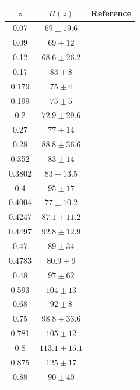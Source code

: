 \documentclass[twocolumn]{aastex631}
\begin{document}
   \begin{table}
      \centering
      \begin{tabular}{ccl}
         \hline\hline
         $z$ & $H(z)$ & Reference \\
         \hline     
         0.07 & $69 \pm 19.6$ & \cite{Zhang_2014} \\
         0.09 & $69 \pm 12$ & \cite{PhysRevD.71.123001} \\
         0.12 & $68.6 \pm 26.2$ & \cite{Zhang_2014} \\
         0.17 & $83 \pm 8$ & \cite{PhysRevD.71.123001} \\
         0.179 & $75 \pm 4$ & \cite{M.Moresco_2012} \\
         0.199 & $75 \pm 5$ & \cite{M.Moresco_2012} \\
         0.2 & $72.9 \pm 29.6$ & \cite{Zhang_2014} \\
         0.27 & $77 \pm 14$ & \cite{PhysRevD.71.123001} \\
         0.28 & $88.8 \pm 36.6$ & \cite{Zhang_2014} \\
         0.352 & $83 \pm 14$ & \cite{M.Moresco_2012} \\
         0.3802 & $83 \pm 13.5$ & \cite{Moresco_2016}  \\
         0.4 & $95 \pm 17$ & \cite{PhysRevD.71.123001} \\
         0.4004 & $77 \pm 10.2$ & \cite{Moresco_2016} \\
         0.4247 & $87.1 \pm 11.2$ & \cite{Moresco_2016} \\
         0.4497 & $92.8 \pm 12.9$ & \cite{Moresco_2016} \\
         0.47 & $89 \pm 34$ & \cite{10.1093/mnras/stx301} \\
         0.4783 & $80.9 \pm 9$ & \cite{Moresco_2016} \\
         0.48 & $97 \pm 62$ & \cite{Daniel.Stern_2010} \\
         0.593 & $104 \pm 13$ & \cite{M.Moresco_2012} \\
         0.68 & $92 \pm 8$ & \cite{M.Moresco_2012} \\
         0.75 & $98.8 \pm 33.6$ & \cite{Borghi_2022} \\
         0.781 & $105 \pm 12$ & \cite{M.Moresco_2012} \\
         0.8 & $113.1 \pm 15.1$ & \cite{Jiao_2023} \\
         0.875 & $125 \pm 17$ & \cite{M.Moresco_2012} \\
         0.88 & $90 \pm 40$ & \cite{Daniel.Stern_2010} \\

\end{tabular}
\end{table}
\end{document}
